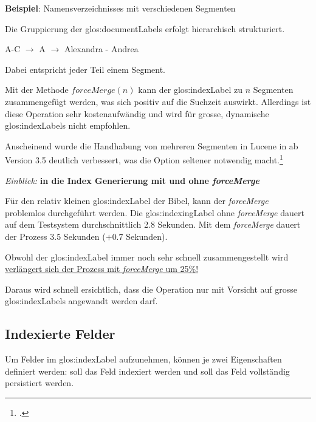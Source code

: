 \begin{framed}
	\textbf{Beispiel}: Namensverzeichnisses mit verschiedenen Segmenten

	Die Gruppierung der \glspl{glos:documentLabel} erfolgt hierarchisch strukturiert.

	A-C $\rightarrow$ A $\rightarrow$ Alexandra - Andrea

	Dabei entspricht jeder Teil einem Segment.
\end{framed}

Mit der Methode $forceMerge(n)$ kann der \gls{glos:indexLabel} zu $n$ Segmenten zusammengefügt werden, was sich positiv auf die Suchzeit auswirkt. Allerdings ist diese Operation sehr kostenaufwändig und wird für grosse, dynamische \glspl{glos:indexLabel} nicht empfohlen.

Anscheinend wurde die Handhabung von mehreren Segmenten in Lucene in ab Version 3.5 deutlich verbessert, was die Option seltener notwendig macht.\footcite{LUCENE-rename_optimize_to_a_less_cool-sounding_name_ASF_JIRA_2016-05-08}

\begin{framed}
	\textit{Einblick:} \textbf{in die Index Generierung mit und ohne \textit{forceMerge}}

	Für den relativ kleinen \gls{glos:indexLabel} der Bibel, kann der \textit{forceMerge} problemlos durchgeführt werden.
	Die \gls{glos:indexingLabel} ohne \textit{forceMerge} dauert auf dem Testsystem durchschnittlich 2.8 Sekunden. Mit dem \textit{forceMerge} dauert der Prozess 3.5 Sekunden ($+0.7$ Sekunden).

	Obwohl  der \gls{glos:indexLabel} immer noch sehr schnell zusammengestellt wird \ul{verlängert sich der Prozess mit \textit{forceMerge} um 25\%!}

	Daraus wird schnell ersichtlich, dass die Operation nur mit Vorsicht auf grosse \glspl{glos:indexLabel} angewandt werden darf.
\end{framed}





\subsection{Indexierte Felder}
Um Felder im \gls{glos:indexLabel} aufzunehmen, können je zwei Eigenschaften definiert werden: soll das Feld indexiert werden und soll das Feld vollständig persistiert werden.

